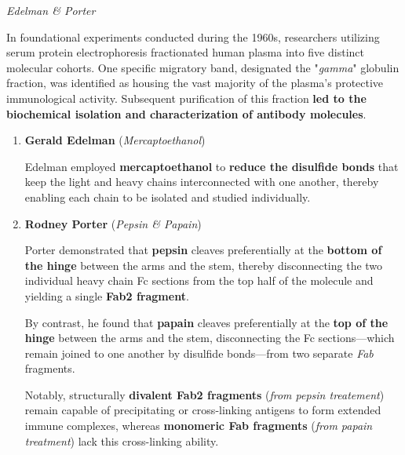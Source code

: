     \begin{core}{\textit{Edelman \& Porter}}

      In foundational experiments conducted during the 1960s, researchers utilizing serum protein electrophoresis fractionated human plasma into five distinct molecular cohorts. One specific migratory band, designated the "\textit{gamma}" globulin fraction, was identified as housing the vast majority of the plasma's protective immunological activity. Subsequent purification of this fraction \textbf{led to the biochemical isolation and characterization of antibody molecules}.

      \begin{enumerate}

        \item \textbf{Gerald Edelman} (\textit{Mercaptoethanol})

          Edelman employed \textbf{mercaptoethanol} to \textbf{reduce the disulfide bonds} that keep the light and heavy chains interconnected with one another, thereby enabling each chain to be isolated and studied individually.


        \item \textbf{Rodney Porter} (\textit{Pepsin \& Papain})

          Porter demonstrated that \textbf{pepsin} cleaves preferentially at the \textbf{bottom of the hinge} between the arms and the stem, thereby disconnecting the two individual heavy chain Fc sections from the top half of the molecule and yielding a single \textbf{Fab2 fragment}.


          By contrast, he found that \textbf{papain} cleaves preferentially at the \textbf{top of the hinge} between the arms and the stem, disconnecting the Fc sections---which remain joined to one another by disulfide bonds---from two separate \textit{Fab} fragments.


          Notably, structurally \textbf{divalent Fab2 fragments} (\textit{from pepsin treatement}) remain capable of precipitating or cross-linking antigens to form extended immune complexes, whereas \textbf{monomeric Fab fragments} (\textit{from papain treatment}) lack this cross-linking ability.

      \end{enumerate}

    \end{core}

